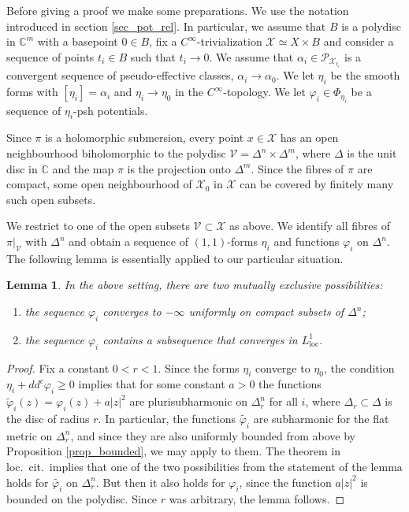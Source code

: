 \documentclass[11pt]{article}
\newcommand{\6}{\partial}
\newcommand{\bbC}{\mathbb{C}}
\newcommand{\PP}{\mathcal{P}}
\newcommand{\VV}{\mathcal{V}}
\newcommand{\XX}{\mathcal{X}}
\renewcommand{\ge}{\geqslant}
\newtheorem{lem}[defn]{Lemma}
\begin{document}
Before giving a proof we make some preparations. We use the notation
introduced in section \ref{sec_pot_rel}. In particular, we assume that $B$
is a polydisc in $\bbC^m$ with a basepoint $0\in B$, fix a $C^\infty$-trivialization
$\XX\simeq X\times B$ and consider a sequence of points $t_i\in B$
such that $t_i\to 0$. We assume that $\alpha_{i}\in\PP_{\XX_{t_i}}$ is a convergent
sequence of pseudo-effective classes, $\alpha_{i}\to \alpha_0$.
We let $\eta_{i}$ be the smooth forms with $[\eta_{i}] = \alpha_{i}$ and $\eta_{i}\to \eta_0$ in the $C^\infty$-topology.
We let $\varphi_i\in \Phi_{\eta_{i}}$ be a sequence of $\eta_i$-psh potentials.

Since $\pi$ is a holomorphic submersion, every point $x\in \XX$
has an open neighbourhood biholomorphic to the polydisc $\VV = \Delta^n\times \Delta^m$,
where $\Delta$ is the unit disc in $\bbC$ and the map $\pi$ is the projection onto $\Delta^m$.
Since the fibres of $\pi$ are compact, some open neighbourhood of $\XX_0$ in $\XX$ can be covered by finitely
many such open subsets.

We restrict to one of the open subsets $\VV\subset \XX$ as above. We identify all fibres
of $\pi|_\VV$ with $\Delta^n$ and obtain a sequence of $(1,1)$-forms $\eta_i$ and functions
$\varphi_i$ on $\Delta^n$. The following lemma is essentially \cite[Theorem 4.1.9(a)]{H2}
applied to our particular situation.

\begin{lem}\label{lem_potentials}
In the above setting, there are two mutually exclusive possibilities:
\begin{enumerate}
\item the sequence $\varphi_i$
converges to $-\infty$ uniformly on compact subsets of $\Delta^n$;
\item the sequence $\varphi_i$ contains a subsequence that converges in $L^1_{\mathrm{loc}}$.
\end{enumerate}
\end{lem}
\begin{proof}
Fix a constant $0 <r < 1$.
Since the forms $\eta_i$ converge to $\eta_0$, the condition
$\eta_i+ dd^c\varphi_i\ge 0$ implies that for some constant $a>0$ the functions
$\tilde{\varphi}_i(z) = \varphi_i(z) + a|z|^2$ are plurisubharmonic on $\Delta_r^n$ for all $i$,
where $\Delta_r\subset \Delta$ is the disc of radius $r$.
In particular, the functions $\tilde{\varphi_i}$ are subharmonic for the flat metric on $\Delta_r^n$, and
since they are also uniformly bounded from above by Proposition \ref{prop_bounded}, we may apply \cite[Theorem 4.1.9(a)]{H2} to them.
The theorem in loc.\ cit.\ implies that one of the two possibilities from the statement
of the lemma holds for $\tilde{\varphi_i}$ on $\Delta^n_r$. But then it also holds for $\varphi_i$,
since the function $a|z|^2$ is bounded on the polydisc. Since $r$ was arbitrary, the lemma follows. 
\end{proof}
\end{document}
